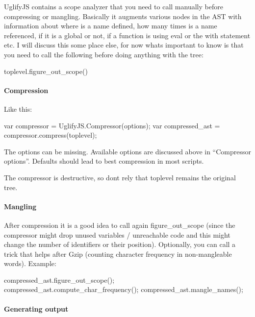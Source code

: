 Uglify\+JS contains a scope analyzer that you need to call manually before compressing or mangling. Basically it augments various nodes in the A\+ST with information about where is a name defined, how many times is a name referenced, if it is a global or not, if a function is using {\ttfamily eval} or the {\ttfamily with} statement etc. I will discuss this some place else, for now what\textquotesingle{}s important to know is that you need to call the following before doing anything with the tree\+: 
\begin{DoxyCode}
toplevel.figure\_out\_scope()
\end{DoxyCode}


\paragraph*{Compression}

Like this\+: 
\begin{DoxyCode}
var compressor = UglifyJS.Compressor(options);
var compressed\_ast = compressor.compress(toplevel);
\end{DoxyCode}


The {\ttfamily options} can be missing. Available options are discussed above in “\+Compressor options”. Defaults should lead to best compression in most scripts.

The compressor is destructive, so don\textquotesingle{}t rely that {\ttfamily toplevel} remains the original tree.

\paragraph*{Mangling}

After compression it is a good idea to call again {\ttfamily figure\+\_\+out\+\_\+scope} (since the compressor might drop unused variables / unreachable code and this might change the number of identifiers or their position). Optionally, you can call a trick that helps after Gzip (counting character frequency in non-\/mangleable words). Example\+: 
\begin{DoxyCode}
compressed\_ast.figure\_out\_scope();
compressed\_ast.compute\_char\_frequency();
compressed\_ast.mangle\_names();
\end{DoxyCode}


\paragraph*{Generating output}

